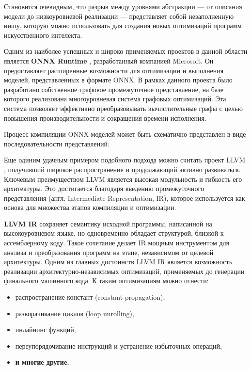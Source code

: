Становится очевидным, что разрыв между уровнями абстракции — от описания модели до низкоуровневой реализации — представляет собой незаполненную нишу, которую можно использовать для создания новых оптимизаций программ искусственного интелекта.

Одним из наиболее успешных и широко применяемых проектов в данной области является \textbf{ONNX Runtime} \cite{onnx_main}, разработанный компанией Microsoft.
Он предоставляет расширенные возможности для оптимизации и выполнения моделей, представленных в формате ONNX.
В рамках данного проекта было разработано собственное графовое промежуточное представление, на базе которого реализована многоуровневая система графовых оптимизаций.
Эта система позволяет эффективно преобразовывать вычислительные графы с целью повышения производительности и сокращения времени исполнения.

Процесс компиляции ONNX-моделей может быть схематично представлен в виде последовательности представлений:
\[\]
\[\]

Еще одиним удачным примером подобного подхода можно считать проект LLVM \cite{llvm_main}, получивший широкое распространение и продолжающий активно развиваться.
Ключевым преимуществом LLVM является высокая модульность и гибкость его архитектуры.
Это достигается благодаря введению промежуточного представления (англ. Intermediate Representation, IR), которое используется как основа для множества этапов компиляции и оптимизации.

\textbf{LLVM IR} \cite{llvm_main} сохраняет семантику исходной программы, написанной на высокоуровневом языке, но одновременно обладает структурой, близкой к ассемблерному коду.
Такое сочетание делает IR мощным инструментом для анализа и преобразования программ на этапе, независимом от целевой архитектуры.
Одним из главных достоинств LLVM IR является возможность реализации архитектурно-независимых оптимизаций, применяемых до генерации финального машинного кода. К таким оптимизациям можно отнести:

\begin{itemize}
    \item распространение констант (constant propagation),
    \item разворачивание циклов (loop unrolling),
    \item инлайнинг функций,
    \item переупорядочивание инструкций и устранение избыточных операций,
    \item \textbf{и многие другие.}
\end{itemize}

